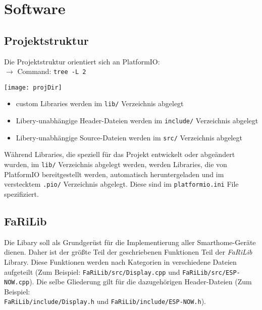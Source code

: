 \chapter{Software}

    \section{Projektstruktur}
    Die Projektstruktur orientiert sich an PlatformIO: \\
    \(\rightarrow\) Command: \texttt{tree -L 2} \\
    \vspace{0.5cm}
    \begin{minipage}{0.48\linewidth}
            \centering
            \texttt{[image: projDir]}
            \label{fig:projDir}
    \end{minipage}
    \hfill
    \begin{minipage}{0.48\linewidth}
        \raggedright
        \begin{itemize}
            \item custom Libraries werden im \lstinline{lib/} 
            Verzeichnis abgelegt
            \item Libery-unabhängige Header-Dateien 
            werden im \lstinline{include/} Verzeichnis abgelegt
            \item Libery-unabhängige Source-Dateien 
            werden im \lstinline{src/} Verzeichnis abgelegt
        \end{itemize}
    \end{minipage}
    \vspace{0.5cm}

    Während Libraries, die speziell für das Projekt entwickelt oder abgeändert wurden,
    im \lstinline{lib/} Verzeichnis abgelegt werden, werden Libraries,
    die von PlatformIO bereitgestellt werden, automatisch heruntergeladen
    und im verstecktem \lstinline{.pio/} Verzeichnis abgelegt. Diese sind im
    \lstinline{platformio.ini} File spezifiziert.

    \section{FaRiLib}
    Die Libary soll als Grundgerüst für die Implementierung aller Smarthome-Geräte
    dienen. Daher ist der größte Teil der geschriebenen Funktionen Teil der 
    \textit{FaRiLib} Library. Diese Funktionen werden nach Kategorien in verschiedene
    Dateien aufgeteilt (Zum Beispiel: \lstinline{FaRiLib/src/Display.cpp} und 
    \lstinline{FaRiLib/src/ESP-NOW.cpp}). Die selbe Gliederung gilt für die 
    dazugehörigen Header-Dateien (Zum Beispiel: \\ \lstinline{FaRiLib/include/Display.h} und 
    \lstinline{FaRiLib/include/ESP-NOW.h}).

